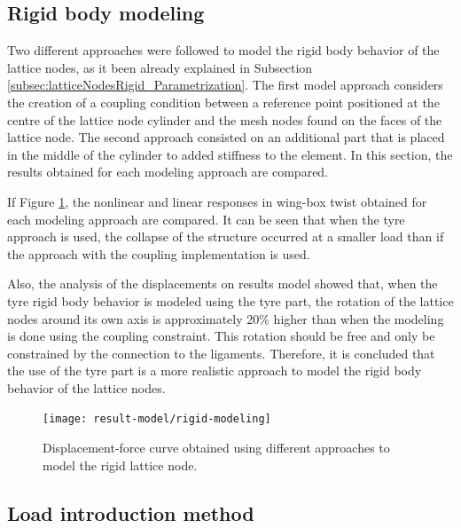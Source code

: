  \subsection{Rigid body modeling} \label{subsec:rigidBody_results_model} %
    
    Two different approaches were followed to model the rigid body behavior of the lattice nodes, as it been already explained in Subsection \ref{subsec:latticeNodesRigid_Parametrization}. The first model approach considers the creation of a coupling condition between a reference point positioned at the centre of the lattice node cylinder and the mesh nodes found on the faces of the lattice node. The second approach consisted on an additional part that is placed in the middle of the cylinder to added stiffness to the element. In this section, the results obtained for each modeling approach are compared.

    If Figure \ref{fig:rigid-modeling}, the nonlinear and linear responses in wing-box twist obtained for each modeling approach are compared. It can be seen that when the tyre approach is used, the collapse of the structure occurred at a smaller load than if the approach with the coupling implementation is used.

    Also, the analysis of the displacements on results model showed that, when the tyre rigid body behavior is modeled using the tyre part, the rotation of the lattice nodes around its own axis is approximately 20\% higher than when the modeling is done using the coupling constraint. This rotation should be free and only be constrained by the connection to the ligaments. Therefore, it is concluded that the use of the tyre part is a more realistic approach to model the rigid body behavior of the lattice nodes.

    \begin{figure}[!htpb]
      \centering
      \texttt{[image: result-model/rigid-modeling]}
      \caption[Displacement-force curve obtained using different approaches to model the rigid lattice node]{Displacement-force curve obtained using different approaches to model the rigid lattice node. }\label{fig:rigid-modeling}
    \end{figure}

  \clearpage
  \subsection{Load introduction method} \label{subsec:load_results_model}

